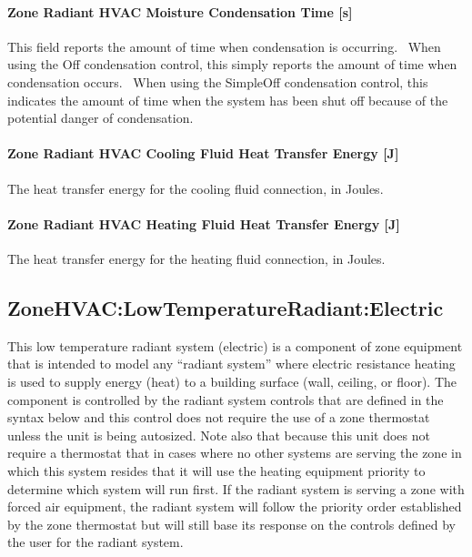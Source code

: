\paragraph{Zone Radiant HVAC Moisture Condensation Time {[}s{]}}\label{zone-radiant-hvac-moisture-condensation-time-s}

This field reports the amount of time when condensation is occurring.~ When using the Off condensation control, this simply reports the amount of time when condensation occurs.~ When using the SimpleOff condensation control, this indicates the amount of time when the system has been shut off because of the potential danger of condensation.

\paragraph{Zone Radiant HVAC Cooling Fluid Heat Transfer Energy {[}J{]}}\label{zone-radiant-hvac-cooling-fluid-heat-transfer-energy-j}

The heat transfer energy for the cooling fluid connection, in Joules.

\paragraph{Zone Radiant HVAC Heating Fluid Heat Transfer Energy {[}J{]}}\label{zone-radiant-hvac-heating-fluid-heat-transfer-energy-j}

The heat transfer energy for the heating fluid connection, in Joules.

\subsection{ZoneHVAC:LowTemperatureRadiant:Electric}\label{zonehvaclowtemperatureradiantelectric}

This low temperature radiant system (electric) is a component of zone equipment that is intended to model any ``radiant system'' where electric resistance heating is used to supply energy (heat) to a building surface (wall, ceiling, or floor). The component is controlled by the radiant system controls that are defined in the syntax below and this control does not require the use of a zone thermostat unless the unit is being autosized. Note also that because this unit does not require a thermostat that in cases where no other systems are serving the zone in which this system resides that it will use the heating equipment priority to determine which system will run first. If the radiant system is serving a zone with forced air equipment, the radiant system will follow the priority order established by the zone thermostat but will still base its response on the controls defined by the user for the radiant system.


